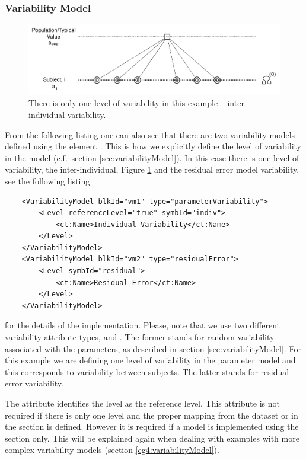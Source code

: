 \subsubsection{Variability Model}
\label{sec:eg1-variability}
\begin{figure}[ht!]
\centering
 \includegraphics[width=130mm]{pics/IOV0}
\caption{There is only one level of variability in this example -- inter-individual variability.}
\label{fig:tree_IOV0}
\end{figure}
From the following listing one can also see that there
are two variability models defined using the element
. This is how we explicitly define the
level of variability in the model (c.f.\ section
\ref{sec:variabilityModel}). In this case there is one level of 
variability, the inter-individual, Figure \ref{fig:tree_IOV0} and the residual
error model variability, see the following listing 
\lstset{language=XML}
\begin{lstlisting}
    <VariabilityModel blkId="vm1" type="parameterVariability">
        <Level referenceLevel="true" symbId="indiv">
            <ct:Name>Individual Variability</ct:Name>
        </Level>
    </VariabilityModel>
    <VariabilityModel blkId="vm2" type="residualError">
        <Level symbId="residual">
            <ct:Name>Residual Error</ct:Name>
        </Level>
    </VariabilityModel>
\end{lstlisting}
for the details of the implementation. Please, note that we use two different variability 
attribute types,  and . The former stands for random variability
associated with the parameters, as described in section \ref{sec:variabilityModel}. 
For this example we are defining one level of variability in the parameter model and this
corresponds to variability between subjects. The latter stands for residual error variability.

The attribute  identifies the  level as the reference level.
This attribute is not required if there is only one level and the proper mapping from the 
dataset or  in the  section is defined. However it is 
required if a model is implemented using the  section only.
This will be explained again when dealing with examples with more complex variability models (section \ref{eg4:variabilityModel}).

